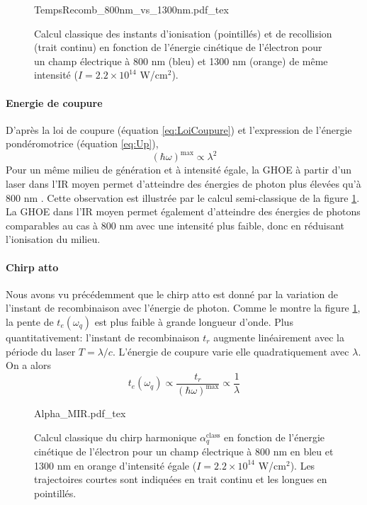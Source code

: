 \begin{figure}[ht]
\centering
\def\svgwidth{0.7\columnwidth}
{TempsRecomb_800nm_vs_1300nm.pdf_tex}
\caption{Calcul classique des instants d'ionisation (pointillés) et de recollision (trait continu) en fonction de l'énergie cinétique de l'électron pour un champ électrique à 800 nm (bleu) et 1300 nm (orange) de même intensité ($I = 2.2 \times 10^{14}$ W/cm$^2$).}
\label{fig:Recomb_vs_Lambda}
\end{figure}

\paragraph{Energie de coupure} D'après la loi de coupure (équation \ref{eq:LoiCoupure}) et l'expression de l'énergie pondéromotrice (équation \ref{eq:Up}),
\begin{equation}
(\hbar \omega)^{\text{max}} \propto \lambda^2
\end{equation}
Pour un même milieu de génération et à intensité égale, la GHOE à partir d'un laser dans l'IR moyen permet d'atteindre des énergies de photon plus élevées qu'à 800 nm .  Cette observation est illustrée par le calcul semi-classique de la figure \ref{fig:Recomb_vs_Lambda}. La GHOE dans l'IR moyen permet également d'atteindre des énergies de photons comparables au cas à 800 nm avec une intensité plus faible, donc en réduisant l'ionisation du milieu.

\paragraph{Chirp atto} Nous avons vu précédemment que le chirp atto est donné par la variation de l'instant de recombinaison avec l'énergie de photon. Comme le montre la figure \ref{fig:Recomb_vs_Lambda}, la pente de $t_e(\omega_q)$ est plus faible à grande longueur d'onde. Plus quantitativement: l'instant de recombinaison $t_r$ augmente linéairement avec la période du laser $T = \lambda/c$. L'énergie de coupure varie elle quadratiquement avec $\lambda$. On a alors
\begin{equation}
t_e (\omega_q) \propto \frac{t_r}{(\hbar \omega)^{\text{max}}} \propto \frac{1}{\lambda}
\end{equation}

\begin{figure}
\centering
\def\svgwidth{0.7\columnwidth}
{Alpha_MIR.pdf_tex}
\caption{Calcul classique du chirp harmonique $\alpha_q^{\text{class}}$ en fonction de l'énergie cinétique de l'électron pour un champ électrique à 800 nm en bleu et 1300 nm en orange d'intensité égale ($I = 2.2 \times 10^{14}$ W/cm$^2$). Les trajectoires courtes sont indiquées en trait continu et les longues en pointillés.}
\label{fig:AlphaMIR}
\end{figure}

